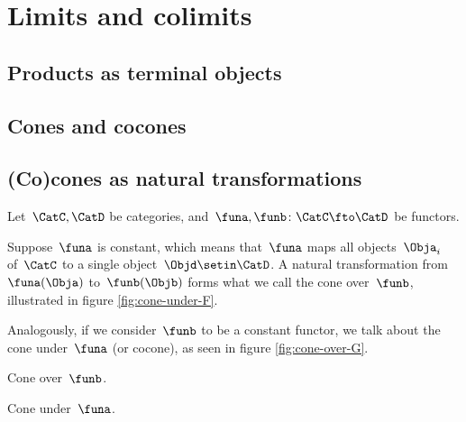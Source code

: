 

\section{Limits and colimits}

\subsection{Products as terminal objects}

\subsection{Cones and cocones}



\subsection{(Co)cones as natural transformations} 

    Let~$\CatC, \CatD$ be categories, and~$\funa, \funb\colon\CatC\fto\CatD$ be functors. 
    
    Suppose~$\funa$ is constant, which means that~$\funa$ maps all objects~$\Obja_i$ of~$\CatC$ to a single object~$\Objd \setin \CatD$.
    A natural transformation from~$\funa(\Obja)$ to~$\funb(\Objb)$ forms what we call the cone over~$\funb$, illustrated in figure \cref{fig:cone-under-F}.
    
    Analogously, if we consider~$\funb$ to be a constant functor, we talk about the cone under~$\funa$ (or cocone), as seen in figure \cref{fig:cone-over-G}.



\begin{marginfigure}
    \centering
    \caption{Cone over~$\funb$.
    }
    \label{fig:cone-over-G}
\end{marginfigure}

\begin{marginfigure}
    \centering
    \label{fig:cone-under-F}
    \caption{Cone under~$\funa$.}
\end{marginfigure}


